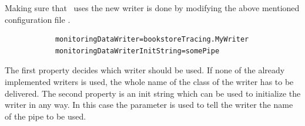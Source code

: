 		\setJavaCodeListing
		

		\noindent Making sure that \Kieker\  uses the new writer is done by modifying the above mentioned configuration file \dir{\monitoringPropertiesFile}.

		\setBashListing       
		\begin{lstlisting}
			monitoringDataWriter=bookstoreTracing.MyWriter
			monitoringDataWriterInitString=somePipe
		\end{lstlisting}

		\noindent The first property decides which writer should be used. If none of the already implemented writers is used, the whole name of the class of the writer has to be delivered. The second property is an init string which can be used to initialize the writer in any way. In this case the parameter is used to tell the writer the name of the pipe to be used.\\
